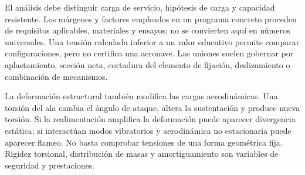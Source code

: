 El análisis debe distinguir carga de servicio, hipótesis de carga y capacidad resistente. Los márgenes y factores empleados en un programa concreto proceden de requisitos aplicables, materiales y ensayos; no se convierten aquí en números universales. Una tensión calculada inferior a un valor educativo permite comparar configuraciones, pero no certifica una aeronave. Las uniones suelen gobernar por aplastamiento, sección neta, cortadura del elemento de fijación, deslizamiento o combinación de mecanismos.

La deformación estructural también modifica las cargas aerodinámicas. Una torsión del ala cambia el ángulo de ataque, altera la sustentación y produce nueva torsión. Si la realimentación amplifica la deformación puede aparecer divergencia estática; si interactúan modos vibratorios y aerodinámica no estacionaria puede aparecer flameo. No basta comprobar tensiones de una forma geométrica fija. Rigidez torsional, distribución de masas y amortiguamiento son variables de seguridad y prestaciones.

